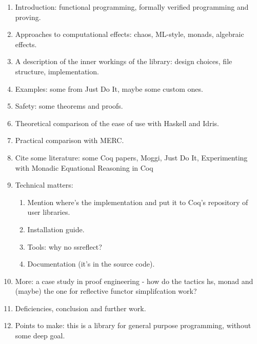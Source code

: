 \documentclass[declaration,inz,english,shortabstract]{iithesis}
\begin{document}
\begin{enumerate}
    \item Introduction: functional programming, formally verified programming and proving.
    \item Approaches to computational effects: chaos, ML-style, monads, algebraic effects.
    \item A description of the inner workings of the library: design choices, file structure, implementation.
    \item Examples: some from Just Do It, maybe some custom ones.
    \item Safety: some theorems and proofs.
    \item Theoretical comparison of the ease of use with Haskell and Idris.
    \item Practical comparison with MERC.
    \item Cite some literature: some Coq papers, Moggi, Just Do It, Experimenting with Monadic Equational Reasoning in Coq
    \item Technical matters:
    \begin{enumerate}
        \item Mention where's the implementation and put it to Coq's repository of user libraries.
        \item Installation guide.
        \item Tools: why no ssreflect?
        \item Documentation (it's in the source code).
    \end{enumerate}
    \item More: a case study in proof engineering - how do the tactics hs, monad and (maybe) the one for reflective functor simplifcation work?
    \item Deficiencies, conclusion and further work.
    \item Points to make: this is a library for general purpose programming, without some deep goal.
\end{enumerate}

\end{document}

